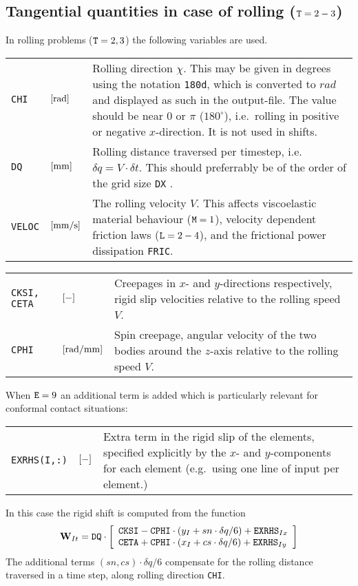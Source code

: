 \documentclass[12pt]{report}
\newenvironment{inputvars}{\vspace{0.4\baselineskip}%

\begin{tabular}{>{\raggedright}p{22mm}p{19mm}p{113mm}}}{
\end{tabular}

}
\newcommand{\inpvar}[3]{{\small\tt #1} & $#2$ & #3 \\[1ex]}
\newcommand{\inpbreak}{\end{inputvars}\begin{inputvars}}
\begin{document}
\subsection{Tangential quantities in case of rolling \texorpdfstring{(${\tt
        T}=2-3$)}{}}
\label{sec:kincns_roll}

In rolling problems (${\tt T}=2,3$) the following variables are used.
\begin{inputvars}
\inpvar{CHI}{\bunit{rad}}{Rolling direction $\chi$. This may be given in
        degrees using the notation {\tt 180d}, which is converted to
        $\unit{rad}$ and displayed as such in the output-file. The value
        should be near $0$ or $\pi$ ($180^\circ$), i.e.\ rolling in
        positive or negative $x$-direction. It is not used in shifts.}
\inpvar{DQ}{\bunit{mm}}{Rolling distance traversed per timestep, i.e.\
        $\delta q=V\cdot\delta t$. This should preferrably be of the
        order of the grid size {\tt DX} \cite{Wekken2017a-wiggles}.}
\inpvar{VELOC}{\bunit{mm/s}}{The rolling velocity $V$. This affects viscoelastic
        material behaviour (${\tt M}=1$), velocity dependent friction laws
        (${\tt L}=2-4$), and the frictional power dissipation {\tt FRIC}.}
\inpbreak
\inpvar{CKSI, CETA}{\bunit{-}}{Creepages in $x$- and $y$-directions respectively,
        rigid slip velocities relative to the rolling speed $V$.}
\inpvar{CPHI}{\bunit{rad/mm}}{Spin creepage, angular velocity of the two bodies
        around the $z$-axis relative to the rolling speed $V$.}
\end{inputvars}
When ${\tt E}=9$ an additional term is added which is particularly relevant
for conformal contact situations:
\begin{inputvars}
\inpvar{EXRHS(I,:)}{\bunit{-}}{Extra term in the rigid slip of the elements,
        specified explicitly by the $x$- and $y$-components for each
        element (e.g.\ using one line of input per element.)}
\end{inputvars}
In this case the rigid shift is computed from the function
\begin{equation}\label{eq:rig_shift_roll}
 \vec{W}_{It} = {\tt DQ} \cdot \left[
        \begin{array}{l}
        {\tt CKSI} - {\tt CPHI} \cdot (y_I+sn\cdot\delta q/6)
                + {\tt EXRHS}_{Ix}  \\
        {\tt CETA} + {\tt CPHI} \cdot (x_I+cs\cdot\delta q/6)
                + {\tt EXRHS}_{Iy}
        \end{array} \right]
\end{equation}
The additional terms $(sn,cs)\cdot\delta q/6$ compensate for the rolling
distance traversed in a time step, along rolling direction {\tt CHI}.
\end{document}
